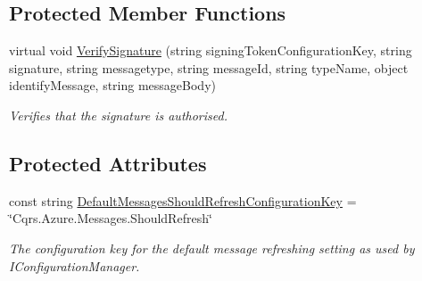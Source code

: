 \subsection*{Protected Member Functions}
\begin{DoxyCompactItemize}
\item 
virtual void \hyperlink{classCqrs_1_1Azure_1_1ServiceBus_1_1AzureBusHelper_a6f35e150ca60f71a73c2f9a6e03f9f56_a6f35e150ca60f71a73c2f9a6e03f9f56}{Verify\+Signature} (string signing\+Token\+Configuration\+Key, string signature, string messagetype, string message\+Id, string type\+Name, object identify\+Message, string message\+Body)
\begin{DoxyCompactList}\small\item\em Verifies that the signature is authorised. \end{DoxyCompactList}\end{DoxyCompactItemize}
\subsection*{Protected Attributes}
\begin{DoxyCompactItemize}
\item 
const string \hyperlink{classCqrs_1_1Azure_1_1ServiceBus_1_1AzureBusHelper_a5d1dcc91b08727fbaee0ec6d32106b16_a5d1dcc91b08727fbaee0ec6d32106b16}{Default\+Messages\+Should\+Refresh\+Configuration\+Key} = \char`\"{}Cqrs.\+Azure.\+Messages.\+Should\+Refresh\char`\"{}
\begin{DoxyCompactList}\small\item\em The configuration key for the default message refreshing setting as used by I\+Configuration\+Manager. \end{DoxyCompactList}\end{DoxyCompactItemize}
